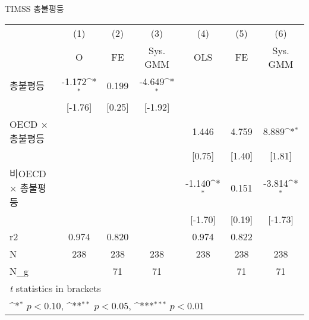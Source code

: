 \centering
\def\sym#1{\ifmmode^{#1}\else\(^{#1}\)\fi}
\caption{TIMSS 총불평등\label{tab:timsssimp}}
\begin{tabular}{l*{6}{c}}
\toprule
                    &\multicolumn{1}{c}{(1)}&\multicolumn{1}{c}{(2)}&\multicolumn{1}{c}{(3)}&\multicolumn{1}{c}{(4)}&\multicolumn{1}{c}{(5)}&\multicolumn{1}{c}{(6)}\\
                    &\multicolumn{1}{c}{O}&\multicolumn{1}{c}{FE}&\multicolumn{1}{c}{Sys. GMM}&\multicolumn{1}{c}{OLS}&\multicolumn{1}{c}{FE}&\multicolumn{1}{c}{Sys. GMM}\\
\midrule
총불평등          &      -1.172\sym{*}  &       0.199         &      -4.649\sym{*}  &                     &                     &                     \\
                    &     [-1.76]         &      [0.25]         &     [-1.92]         &                     &                     &                     \\
\addlinespace
OECD $\times$ 총불평등&                     &                     &                     &       1.446         &       4.759         &       8.889\sym{*}  \\
                    &                     &                     &                     &      [0.75]         &      [1.40]         &      [1.81]         \\
\addlinespace
비OECD $\times$ 총불평등&                     &                     &                     &      -1.140\sym{*}  &       0.151         &      -3.814\sym{*}  \\
                    &                     &                     &                     &     [-1.70]         &      [0.19]         &     [-1.73]         \\
\midrule
r2                  &       0.974         &       0.820         &                     &       0.974         &       0.822         &                     \\
N                   &         238         &         238         &         238         &         238         &         238         &         238         \\
N\_g                 &                     &          71         &          71         &                     &          71         &          71         \\
\bottomrule
\multicolumn{7}{l}{\footnotesize \textit{t} statistics in brackets}\\
\multicolumn{7}{l}{\footnotesize \sym{*} \(p<0.10\), \sym{**} \(p<0.05\), \sym{***} \(p<0.01\)}\\
\end{tabular}
